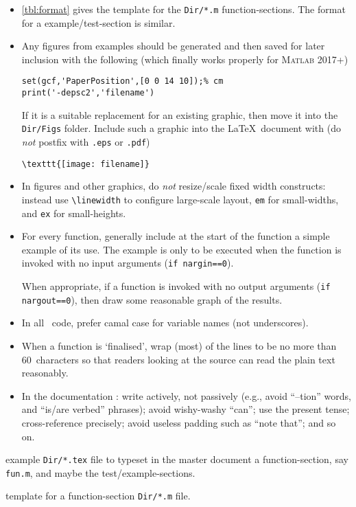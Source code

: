 \begin{itemize}
\item \autoref{tbl:format} gives the template for the \verb|Dir/*.m| function-sections.
The format for a example\slash test-section is similar.

\item Any figures from examples should be generated and then saved for later inclusion with the following (which finally works properly for \textsc{Matlab} 2017+)
\begin{verbatim}
set(gcf,'PaperPosition',[0 0 14 10]);% cm
print('-depsc2','filename')
\end{verbatim}
If it is a suitable replacement for an existing graphic, then move it into the \verb|Dir/Figs| folder.
Include such a graphic into the \LaTeX\ document with (do \emph{not} postfix with \verb|.eps| or \verb|.pdf|)
\begin{verbatim}
\texttt{[image: filename]}
\end{verbatim}

\item   In figures and other graphics, do \emph{not} resize\slash scale fixed width constructs: instead use \verb|\linewidth| to configure large-scale layout, \verb|em| for small-widths, and \verb|ex| for small-heights. 


\item For every function, generally include at the start of the function a simple example of its use.  The example is only to be executed when the function is invoked with no input arguments (\verb|if nargin==0|).

When appropriate, if a function is invoked with no output arguments (\verb|if nargout==0|), then draw some reasonable graph of the results.


\item In all \script\ code, prefer camal case for variable names (not underscores).

\item When a function is `finalised', wrap (most) of the lines to be no more than 60~characters so that readers looking at the source can read the plain text reasonably.


\item In the documentation \cite[e.g.,][Ch.~4]{Higham98}: 
write actively, not passively (e.g., avoid ``--tion'' words, and ``is/are verbed'' phrases);
avoid wishy-washy ``can'';
use the present tense;
cross-reference precisely;
avoid useless padding such as ``note that'';
and so on.

\end{itemize}


\begin{table}
\caption{\label{tbl:funtex}example \texttt{Dir/*.tex} file to typeset in the master document a function-section, say \texttt{fun.m}, and maybe the test\slash example-sections.}
\end{table}
\begin{table}
\caption{\label{tbl:format}template for a function-section \texttt{Dir/*.m} file.}
\end{table}


